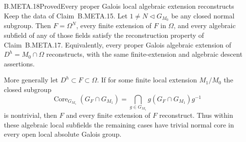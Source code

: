\begin{claim}{B.META.18}{Proved}{Every proper Galois local algebraic extension reconstructs}
Keep the data of Claim~B.META.15.
Let $1\ne N\triangleleft G_{M_0}$ be any
closed normal subgroup.
Then $F=\Omega^N$, every finite extension of
$F$ in $\Omega$, and every algebraic subfield
of any of those fields satisfy the reconstruction
property of Claim~B.META.17.
Equivalently, every proper Galois algebraic
extension of $D^h=M_0\cap\Omega$ reconstructs,
with the same finite-extension and algebraic
descent assertions.

More generally let $D^h\subset F\subset\Omega$.
If for some finite local extension $M_1/M_0$
the closed subgroup
\[
 \operatorname{Core}_{G_{M_1}}(G_F\cap G_{M_1})
   =\bigcap_{g\in G_{M_1}}g(G_F\cap G_{M_1})g^{-1}
                                                        \tag{META.NG4}
\]
is nontrivial, then $F$ and every finite
extension of $F$ reconstruct.
Thus within these algebraic local subfields
the remaining cases have trivial normal
core in every open local absolute Galois
group.
\end{claim}
